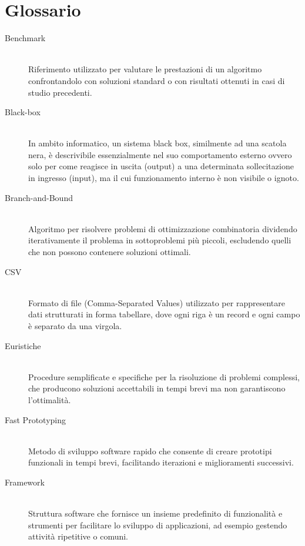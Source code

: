 \cleardoublepage
\chapter{Glossario}

\begin{description}
    \item[Benchmark] \hfill \\
    Riferimento utilizzato per valutare le prestazioni di un algoritmo confrontandolo con soluzioni standard o con risultati ottenuti in casi di studio precedenti.

    \item[Black-box] \hfill \\
    In ambito informatico, un sistema black box, similmente ad una scatola nera, è descrivibile essenzialmente nel suo comportamento esterno ovvero solo per come reagisce in uscita (output) a una determinata sollecitazione in ingresso (input), ma il cui funzionamento interno è non visibile o ignoto.

    \item[Branch-and-Bound] \hfill \\
    Algoritmo per risolvere problemi di ottimizzazione combinatoria dividendo iterativamente il problema in sottoproblemi più piccoli, escludendo quelli che non possono contenere soluzioni ottimali.

    \item[CSV] \hfill \\
    Formato di file (Comma-Separated Values) utilizzato per rappresentare dati strutturati in forma tabellare, dove ogni riga è un record e ogni campo è separato da una virgola.

    \item[Euristiche] \hfill \\
    Procedure semplificate e specifiche per la risoluzione di problemi complessi, che producono soluzioni accettabili in tempi brevi ma non garantiscono l'ottimalità.

    \item[Fast Prototyping] \hfill \\
    Metodo di sviluppo software rapido che consente di creare prototipi funzionali in tempi brevi, facilitando iterazioni e miglioramenti successivi.

    \item[Framework] \hfill \\
    Struttura software che fornisce un insieme predefinito di funzionalità e strumenti per facilitare lo sviluppo di applicazioni, ad esempio gestendo attività ripetitive o comuni.


\end{description}
